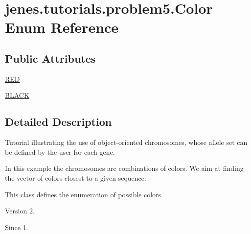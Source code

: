 \hypertarget{enumjenes_1_1tutorials_1_1problem5_1_1_color}{\section{jenes.\-tutorials.\-problem5.\-Color Enum Reference}
\label{enumjenes_1_1tutorials_1_1problem5_1_1_color}
}
\subsection*{Public Attributes}
\begin{DoxyCompactItemize}
\item 
\hyperlink{enumjenes_1_1tutorials_1_1problem5_1_1_color_a820ec36787044c1681e2768b18a4a38e}{R\-E\-D}
\item 
\hyperlink{enumjenes_1_1tutorials_1_1problem5_1_1_color_a6628df3180f62635a91cb1cd749af195}{B\-L\-A\-C\-K}
\end{DoxyCompactItemize}


\subsection{Detailed Description}
Tutorial illustrating the use of object-\/oriented chromosomes, whose allele set can be defined by the user for each gene.

In this example the chromosomes are combinations of colors. We aim at finding the vector of colors closest to a given sequence.

This class defines the enumeration of possible colors.

\begin{DoxyVersion}{Version}
2. 
\end{DoxyVersion}
\begin{DoxySince}{Since}
1. 
\end{DoxySince}


